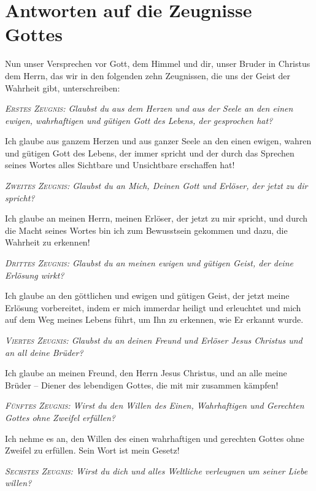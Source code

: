 
\raggedbottom
\chapter{Antworten auf die Zeugnisse Gottes}



Nun unser Versprechen vor Gott, dem Himmel und dir, unser Bruder in Christus dem Herrn, das wir in den folgenden zehn Zeugnissen, die uns der Geist der Wahrheit gibt, unterschreiben:

\textit{\textsc{Erstes Zeugnis:} Glaubst du aus dem Herzen und aus der Seele an den einen ewigen, wahrhaftigen und gütigen Gott des Lebens, der gesprochen hat?}

Ich glaube aus ganzem Herzen und aus ganzer Seele an den einen ewigen, wahren und gütigen Gott des Lebens, der immer spricht und der durch das Sprechen seines Wortes alles Sichtbare und Unsichtbare erschaffen hat!

\textit{\textsc{Zweites Zeugnis:} Glaubst du an Mich, Deinen Gott und Erlöser, der jetzt zu dir spricht?}

Ich glaube an meinen Herrn, meinen Erlöser, der jetzt zu mir spricht, und durch die Macht seines Wortes bin ich zum Bewusstsein gekommen und dazu, die Wahrheit zu erkennen!

\textit{\textsc{Drittes Zeugnis:} Glaubst du an meinen ewigen und gütigen Geist, der deine Erlösung wirkt?}

Ich glaube an den göttlichen und ewigen und gütigen Geist, der jetzt meine Erlösung vorbereitet, indem er mich immerdar heiligt und erleuchtet und mich auf dem Weg meines Lebens führt, um Ihn zu erkennen, wie Er erkannt wurde. 

\textit{\textsc{Viertes Zeugnis:} Glaubst du an deinen Freund und Erlöser Jesus Christus und an all deine Brüder?}

Ich glaube an meinen Freund, den Herrn Jesus Christus, und an alle meine Brüder -- Diener des lebendigen Gottes, die mit mir zusammen kämpfen!

\textit{\textsc{Fünftes Zeugnis:} Wirst du den Willen des Einen, Wahrhaftigen und Gerechten Gottes ohne Zweifel erfüllen? }

Ich nehme es an, den Willen des einen wahrhaftigen und gerechten Gottes ohne Zweifel zu erfüllen. Sein Wort ist mein Gesetz!

\textit{\textsc{Sechstes Zeugnis:} Wirst du dich und alles Weltliche verleugnen um seiner Liebe willen?}

